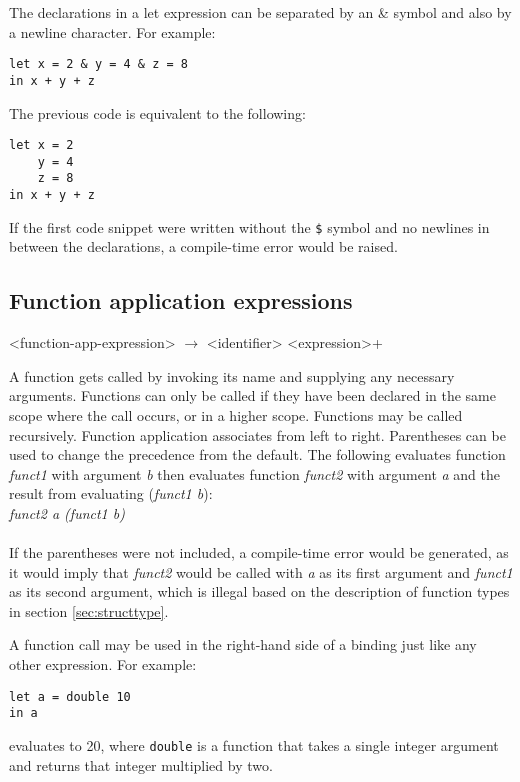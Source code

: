 The declarations in a let expression can be separated by an \& symbol and also by a newline character. For example:

\begin{verbatim}
let x = 2 & y = 4 & z = 8 
in x + y + z
\end{verbatim}

The previous code is equivalent to the following:

\begin{verbatim}
let x = 2
    y = 4
    z = 8
in x + y + z
\end{verbatim}

If the first code snippet were written without the \texttt{\$} symbol and no newlines in between the
declarations, a compile-time error would be raised.

\subsection{Function application expressions}

\begin{grammar}
<function-app-expression> $\rightarrow$ <identifier> <expression>+
\end{grammar}

A function gets called by invoking its name and supplying any necessary arguments. 
Functions can only be called if they have been declared in the same scope where the call occurs,
or in a higher scope. Functions may be called recursively. Function application associates 
from left to right. Parentheses can be used to change the precedence from the default.
The following evaluates function \emph{funct1} with argument \emph{b} then evaluates function
\emph{funct2} with argument \emph{a} and the result from evaluating (\emph{funct1 b}): \\
    
    \emph{funct2 a (funct1 b)}\\ \\
If the parentheses were not included, a compile-time error would be generated, as it would imply
that \emph{funct2} would be called with \emph{a} as
its first argument and \emph{funct1} as its second argument, which is illegal based on the description
of function types in section \ref{sec:structtype}.

A function call may be used in the right-hand side of a binding just like any other expression. 
For example:
\begin{verbatim}
let a = double 10 
in a
\end{verbatim}
evaluates to 20, where \texttt{double} is a function that takes a single integer argument and
returns that integer multiplied by two. 


